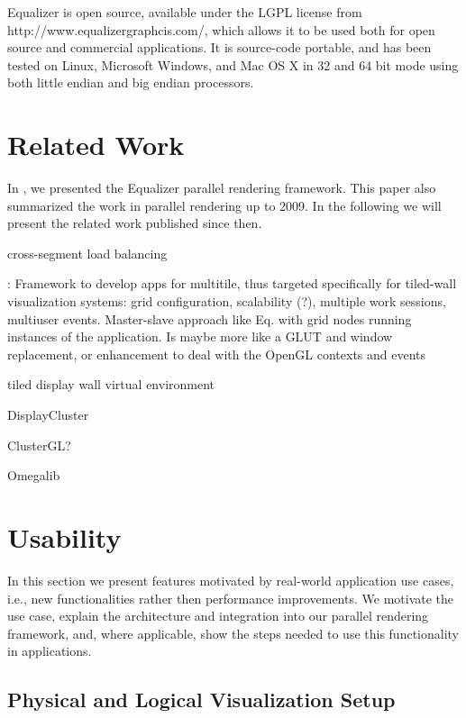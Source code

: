 \documentclass[10pt,journal,compsoc]{IEEEtran}
\begin{document}
Equalizer is open source, available under the LGPL license from http://www.equalizergraphcis.com/, which allows it to be used both for open source and commercial applications. It is source-code portable, and has been tested on Linux, Microsoft Windows, and Mac OS X in 32 and 64 bit mode using both little endian and big endian processors.


\section{Related Work}
\label{SEC_related}

In \cite{EMP:09}, we presented the Equalizer parallel rendering framework. This
paper also summarized the work in parallel rendering up to 2009. In the
following we will present the related work published since then.

\cite{EEP:11} cross-segment load balancing

\cite{DK:11}: Framework to develop apps for multitile, thus targeted
specifically for tiled-wall visualization systems: grid configuration,
scalability (?), multiple work sessions, multiuser events. Master-slave approach
like Eq. with grid nodes running instances of the application. Is maybe more
like a GLUT and window replacement, or enhancement to deal with the OpenGL
contexts and events

\cite{CKP:12} tiled display wall virtual environment

\cite{TBD} DisplayCluster

\cite{NHM:11} ClusterGL?

Omegalib

\section{Usability}

In this section we present features motivated by real-world application use
cases, i.e., new functionalities rather then performance improvements. We
motivate the use case, explain the architecture and integration into our
parallel rendering framework, and, where applicable, show the steps needed to
use this functionality in applications.

\subsection{Physical and Logical Visualization Setup}
\end{document}
